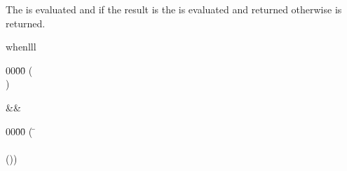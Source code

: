 \begin{optDefinition}
%
\Syntax
{}%
%
\result%
The  is evaluated and if the result is \true{} the
 is evaluated and returned otherwise \nil{} is returned.
%
\rewriterules
%
\begin{RewriteTable}{when}{lll}
    \begin{minipage}[t]{0.45\columnwidth}
        \begin{tabbing}
            00\=00\= \kill
            (  \\
            \>)
        \end{tabbing}
    \end{minipage}
    &\rewrite&
    \begin{minipage}[t]{0.45\columnwidth}
        \begin{tabbing}
            00\=00\= \kill
            ( \= \\
            \>\> \\
            \>())
        \end{tabbing}%
    \end{minipage}%
\end{RewriteTable}


\end{optDefinition}
